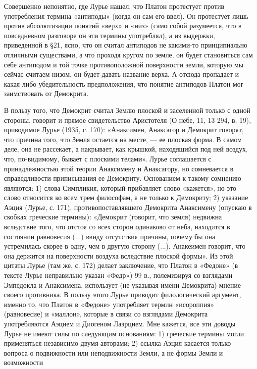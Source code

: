 Совершенно непонятно, где Лурье нашел, что Платон протестует против
употребления термина «антиподы» (когда он сам его ввел). Он протестует
лишь против абсолютизации понятий «верх» и «низ» (само собой
разумеется, что в повседневном разговоре он эти термины употреблял), а
из выдержки, приведенной в §21, ясно, что он считал антиподов не
какими-то принципиально отличными существами, а что проходя кругом по
земле, он будет становиться сам себе антиподом и той точке
противоположной поверхности земли, которую мы сейчас считаем низом, он
будет давать название верха. А отсюда пропадает и какая-либо
убедительность предположения, что понятие антиподов Платон мог
заимствовать от Демокрита.

В пользу того, что Демокрит считал Землю плоской и заселенной только с
одной стороны, говорит и прямое свидетельство Аристотеля (О небе, 11,
13 294, в. 19), приводимое Лурье (1935, с. 170): «Анаксимен,
Анаксагор и Демокрит говорят, что причина того, что Земля остается на
месте, --- ее плоская форма. В самом деле, она не рассекает, а
накрывает, как крышкой, находящийся под ней воздух, что, по-видимому,
бывает с плоскими телами». Лурье соглашается с принадлежностью этой
теории Анаксимену и Анаксагору, но сомневается в справедливости
приписывания ее Демокриту. Основанием к такому сомнению являются: 1)
слова Симпликия, который прибавляет слово «кажется», но это слово
относится ко всем трем философам, а не только к Демокриту; 2) указание
Аэция (Лурье, с. 171), противопоставлявшего Демокрита Анаксимену
(опускаю в скобках греческие термины): «Демокрит (говорит, что земля)
недвижна вследствие того, что отстоя со всех сторон одинаково от неба,
находится в состоянии равновесия (...) ввиду отсутствия причины,
почему бы она устремилась скорее в одну, чем в другую сторону (...).
Анакеимен говорит, что она держится на поверхности воздуха вследствие
плоской формы». Из этой цитаты Лурье (там же, с. 172) делает
заключение, что Платон в «Федоне» (в тексте Лурье неправильно указан
«Федр») 99 в., полемизируя со взглядами Эмпедокла и Анаксимена,
использует (не указывая имени Демокрита) мнение своего противника. В
пользу этого Лурье приводит филологический аргумент, именно то, что
Платон в «Федоне» употребляет термин «исороппия» (равновесие) и
«маллон», которые в связи со взглядами Демокрита употребляются Аэцием
и Диогеном Лаэрцием. Мне кажется, все эти доводы Лурье не имеют силы
по следующим основаниям: 1) греческие термины могли применяться
независимо двумя авторами; 2) ссылка Аэция касается только вопроса о
подвижности или неподвижности Земли, а не формы Земли и возможности

